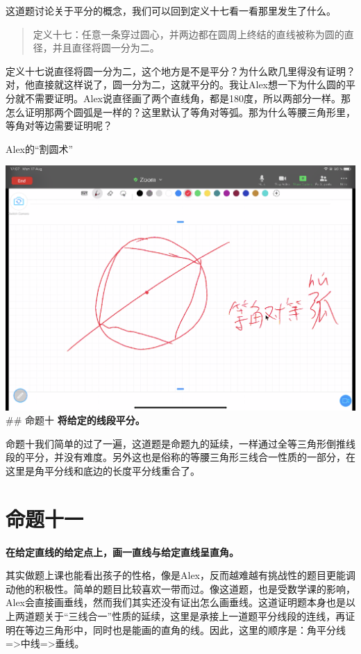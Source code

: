 \documentclass[
]{book}
\begin{document}
这道题讨论关于平分的概念，我们可以回到定义十七看一看那里发生了什么。

\begin{quote}
定义十七：任意一条穿过圆心，并两边都在圆周上终结的直线被称为圆的直径，并且直径将圆一分为二。
\end{quote}

定义十七说直径将圆一分为二，这个地方是不是平分？为什么欧几里得没有证明？对，他直接就这样说了，圆一分为二，这就平分的。我让Alex想一下为什么圆的平分就不需要证明。Alex说直径画了两个直线角，都是180度，所以两部分一样。那怎么证明那两个圆弧是一样的？这里默认了等角对等弧。那为什么等腰三角形里，等角对等边需要证明呢？

Alex的``割圆术''

\includegraphics[width=1\linewidth]{./image/07-prop9-image8}
\#\# 命题十
\textbf{将给定的线段平分。}

命题十我们简单的过了一遍，这道题是命题九的延续，一样通过全等三角形倒推线段的平分，并没有难度。另外这也是俗称的等腰三角形三线合一性质的一部分，在这里是角平分线和底边的长度平分线重合了。

\hypertarget{ux547dux9898ux5341ux4e00}{%
\section{命题十一}\label{ux547dux9898ux5341ux4e00}}

\textbf{在给定直线的给定点上，画一直线与给定直线呈直角。}

其实做题上课也能看出孩子的性格，像是Alex，反而越难越有挑战性的题目更能调动他的积极性。简单的题目比较喜欢一带而过。像这道题，也是受数学课的影响，Alex会直接画垂线，然而我们其实还没有证出怎么画垂线。这道证明题本身也是以上两道题关于``三线合一''性质的延续，这里是承接上一道题平分线段的连线，再证明在等边三角形中，同时也是能画的直角的线。因此，这里的顺序是：角平分线=\textgreater 中线=\textgreater 垂线。
\end{document}
